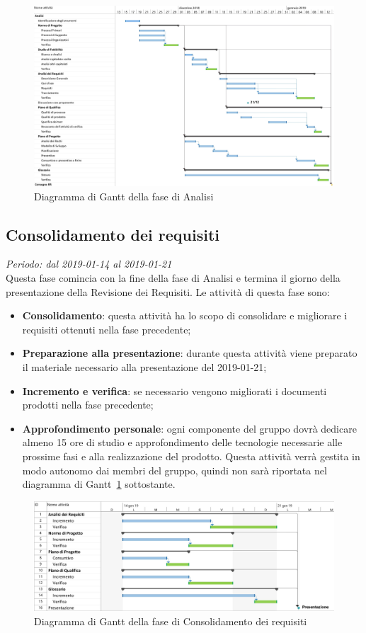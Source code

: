 \begin{figure}[H]
	\includegraphics[width=0.99\linewidth]{res/images/gantt_analisi.jpg}
	\caption{Diagramma di Gantt della fase di Analisi}
\end{figure}


\subsection{Consolidamento dei requisiti}
\textit{Periodo: dal 2019-01-14 al 2019-01-21} \\
Questa fase comincia con la fine della fase di Analisi e termina il 
giorno della presentazione della Revisione dei Requisiti. Le attività 
di questa fase sono:
\begin{itemize}
	\item \textbf{Consolidamento}: questa attività ha lo scopo di consolidare e 
	migliorare i requisiti ottenuti nella fase precedente;
	\item \textbf{Preparazione alla presentazione}: durante questa attività 
	viene preparato il materiale necessario alla presentazione del 2019-01-21;
	\item \textbf{Incremento e verifica}: se necessario vengono migliorati i 
	documenti prodotti nella fase precedente;
	\item \textbf{Approfondimento personale}: ogni componente del gruppo dovrà 
	dedicare almeno 15 ore di studio e approfondimento delle tecnologie 
	necessarie alle prossime fasi e alla realizzazione del prodotto. Questa 
	attività verrà gestita in modo autonomo dai membri del gruppo, quindi non 
	sarà riportata nel diagramma di Gantt~\ref{fig:gantt_con} sottostante.
\end{itemize}

\begin{figure}[H]
	\includegraphics[width=0.99\linewidth]{res/images/gantt_cons.jpg}
	\caption{Diagramma di Gantt della fase di Consolidamento dei requisiti}
	\label{fig:gantt_con}
\end{figure}

